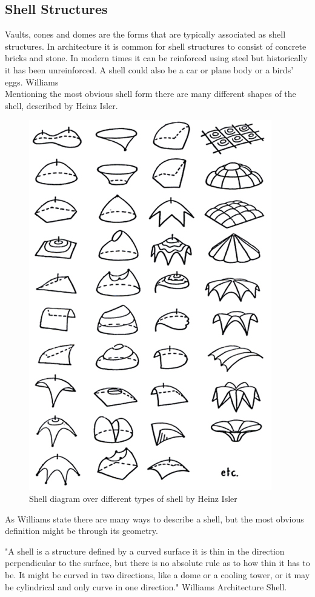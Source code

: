 \subsection{Shell Structures}

Vaults, cones and domes are the forms that are typically associated as shell structures. In architecture it is common for shell structures to consist of concrete bricks and stone. In modern times it can be reinforced using steel but historically it has been unreinforced. A shell could also be a car or plane body or a birds' eggs. Williams \\

Mentioning the most obvious shell form there are many different shapes of the shell, described by Heinz Isler.

\begin{figure}[H]
\centering
\includegraphics[width=0.6\linewidth ]{figure/Introduction/ShellDiagram.jpg}
\caption{Shell diagram over different types of shell by Heinz Isler}
\end{figure}

As Williams state there are many ways to describe a shell, but the most obvious definition might be through its geometry.

"A shell is a structure defined by a curved surface it is thin in the direction perpendicular to the surface, but there is no absolute rule as to how thin it has to be. It might be curved in two directions, like a dome or a cooling tower, or it may be cylindrical and only curve in one direction." Williams Architecture Shell.

